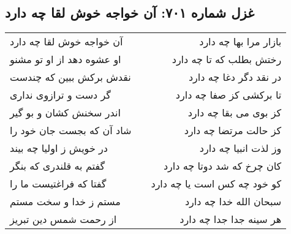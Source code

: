 \begin{center}
\section*{غزل شماره ۷۰۱: آن خواجه خوش لقا چه دارد}
\label{sec:0701}
\begin{longtable}{l p{0.5cm} r}
آن خواجه خوش لقا چه دارد
&&
بازار مرا بها چه دارد
\\
او عشوه دهد از او تو مشنو
&&
رختش بطلب که تا چه دارد
\\
نقدش برکش ببین که چندست
&&
در نقد دگر دغا چه دارد
\\
گر دست و ترازوی نداری
&&
تا برکشی کز صفا چه دارد
\\
اندر سخنش کشان و بو گیر
&&
کز بوی می بقا چه دارد
\\
شاد آن که بجست جان خود را
&&
کز حالت مرتضا چه دارد
\\
در خویش ز اولیا چه بیند
&&
وز لذت انبیا چه دارد
\\
گفتم به قلندری که بنگر
&&
کان چرخ که شد دوتا چه دارد
\\
گفتا که فراغتیست ما را
&&
کو خود چه کس است یا چه دارد
\\
مستم ز خدا و سخت مستم
&&
سبحان الله خدا چه دارد
\\
از رحمت شمس دین تبریز
&&
هر سینه جدا جدا چه دارد
\\
\end{longtable}
\end{center}
